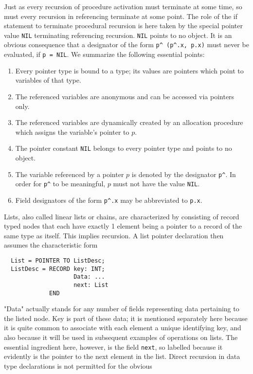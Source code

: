 Just as every recursion of procedure activation must terminate at some time, so must every
recursion in referencing terminate at some point. The role of the if statement to terminate
procedural recursion is here taken by the special pointer value \verb|NIL| terminating
referencing recursion. \verb|NIL| points to no object. It is an obvious consequence that a
designator of the form \verb|p^ (p^.x, p.x)| must never be evaluated, if \verb|p = NIL|.
We summarize the following essential points:
\begin{enumerate}
  \item Every pointer type is bound to a type; its values are pointers which point to
    variables of that type.
  \item The referenced variables are anonymous and can be accessed via pointers only.
  \item The referenced variables are dynamically created by an allocation procedure which
    assigns the variable's pointer to $p$.
  \item The pointer constant \verb|NIL| belongs to every pointer type and points to no object.
  \item The variable referenced by a pointer $p$ is denoted by the designator \verb|p^|.
    In order for \verb|p^| to be meaningful, $p$ must not have the value \verb|NIL|.
  \item Field designators of the form \verb|p^.x| may be abbreviated to \verb|p.x|.
\end{enumerate}
Lists, also called linear lists or chains, are characterized by consisting of record typed
nodes that each have exactly 1 element being a pointer to a record of the same type as itself.
This implies recursion. A list pointer declaration then assumes the characteristic form
\begin{verbatim}
  List = POINTER TO ListDesc;
  ListDesc = RECORD key: INT;
                    Data: ...
                    next: List
             END
\end{verbatim}
"Data" actually stands for any number of fields representing data pertaining to the listed
node.  Key is part of these data; it is mentioned separately here because it is quite common
to associate with each element a unique identifying key, and also because it will be used
in subsequent examples of operations on lists. The essential ingredient here, however, is
the field \verb|next|, so labelled because it evidently is the pointer to the next element
in the list. Direct recursion in data type declarations is not permitted for the obvious
